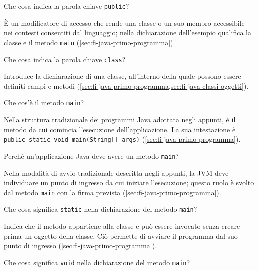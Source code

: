 \begin{exercise}
\label{ex:fi-esercizi-introduzione-java-public}
Che cosa indica la parola chiave \texttt{public}?
\end{exercise}

È un modificatore di accesso che rende una classe o un suo membro accessibile nei
contesti consentiti dal linguaggio; nella dichiarazione dell'esempio
qualifica la classe e il metodo \texttt{main}
(\cref{sec:fi-java-primo-programma}).

\begin{exercise}
\label{ex:fi-esercizi-introduzione-java-class}
Che cosa indica la parola chiave \texttt{class}?
\end{exercise}

Introduce la dichiarazione di una classe, all'interno della quale possono essere
definiti campi e metodi
(\cref{sec:fi-java-primo-programma,sec:fi-java-classi-oggetti}).

\begin{exercise}
\label{ex:fi-esercizi-introduzione-java-main}
Che cos'è il metodo \texttt{main}?
\end{exercise}

Nella struttura tradizionale dei programmi Java adottata negli appunti, è il
metodo da cui comincia l'esecuzione dell'applicazione. La sua intestazione è
\texttt{public static void main(String[] args)}
(\cref{sec:fi-java-primo-programma}).

\begin{exercise}
\label{ex:fi-esercizi-introduzione-java-main-necessita}
Perché un'applicazione Java deve avere un metodo \texttt{main}?
\end{exercise}

Nella modalità di avvio tradizionale descritta negli appunti, la JVM deve
individuare un punto di ingresso da cui iniziare l'esecuzione; questo ruolo è
svolto dal metodo \texttt{main} con la firma prevista
(\cref{sec:fi-java-primo-programma}).

\begin{exercise}
\label{ex:fi-esercizi-introduzione-java-static-main}
Che cosa significa \texttt{static} nella dichiarazione del metodo \texttt{main}?
\end{exercise}

Indica che il metodo appartiene alla classe e può essere invocato senza creare
prima un oggetto della classe. Ciò permette di avviare il programma
dal suo punto di ingresso
(\cref{sec:fi-java-primo-programma}).

\begin{exercise}
\label{ex:fi-esercizi-introduzione-java-void-main}
Che cosa significa \texttt{void} nella dichiarazione del metodo \texttt{main}?
\end{exercise}

